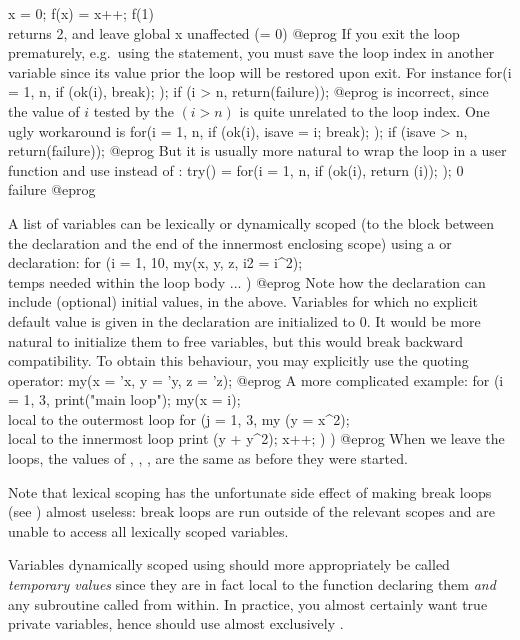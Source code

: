 x = 0;
f(x) = x++;
f(1)  \\ returns 2, and leave global x unaffected (= 0)
@eprog\noindent
If you exit the loop prematurely, e.g.~using the  statement, you
must save the loop index in another variable since its value prior the loop
will be restored upon exit. For instance
\bprog
  for(i = 1, n,
    if (ok(i), break);
  );
  if (i > n, return(failure));
@eprog\noindent
is incorrect, since the value of $i$ tested by the $(i > n)$ is quite
unrelated to the loop index. One ugly workaround is
\bprog
  for(i = 1, n,
    if (ok(i), isave = i; break);
  );
  if (isave > n, return(failure));
@eprog\noindent
But it is usually more natural to wrap the loop in a user function
and use  instead of :
\bprog
try() =
{
  for(i = 1, n,
    if (ok(i), return (i));
  );
  0 \\ failure
}
@eprog

A list of variables can be lexically or dynamically scoped (to the block
between the declaration and the end of the innermost enclosing scope) using a
 or  declaration:
\bprog
for (i = 1, 10,
  my(x, y, z, i2 = i^2); \\ temps needed within the loop body
  ...
)
@eprog\noindent
Note how the declaration can include (optional) initial values,  in the above. Variables for which no explicit default value is given
in the declaration are initialized to $0$. It would be more natural to
initialize them to free variables, but this would break backward
compatibility. To obtain this behaviour, you may explicitly use the quoting
operator:
\bprog
my(x = 'x, y = 'y, z = 'z);
@eprog\noindent
A more complicated example:
\bprog
for (i = 1, 3,
  print("main loop");
  my(x = i);          \\ local to the outermost loop
  for (j = 1, 3,
    my (y = x^2);     \\ local to the innermost loop
    print (y + y^2);
    x++;
  )
)
@eprog\noindent
When we leave the loops, the values of , , , 
are the same as before they were started.

Note that lexical scoping has the unfortunate side effect of making break
loops (see ) almost useless: break loops are run outside
of the relevant scopes and are unable to access all lexically scoped
variables.

Variables dynamically scoped using  should more appropriately be
called \emph{temporary values} since they are in fact local to the function
declaring them \emph{and} any subroutine called from within. In practice, you
almost certainly want true private variables, hence should use almost
exclusively .

